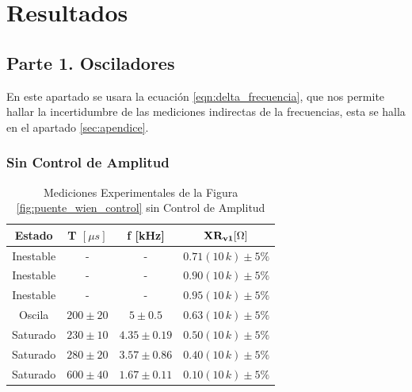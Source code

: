 
\section{Resultados}\label{sec:resultados}

    \subsection{Parte 1. Osciladores}\label{subsec:parte1}

        En este apartado se usara la ecuación \ref{eqn:delta_frecuencia}, que nos permite hallar la incertidumbre de las mediciones indirectas de la frecuencias, esta se halla en el apartado \ref{sec:apendice}.
        
        \subsubsection{Sin Control de Amplitud}
            \begin{table}[H]
              \centering
              \begin{tabular}{|c|c|c|c|}
                \hline
                \textbf{Estado} & \textbf{T $[\mu s]$} & \textbf{f [kHz]} & \textbf{$\mathbf{XR_{v1} [\ohm]}$} \\
                \hline
                Inestable & - & - & $0.71(10 \, k) \pm 5 \%$ \\
                \hline
                Inestable & - & - & $0.90(10 \, k) \pm 5 \%$ \\
                \hline
                Inestable & - & - & $0.95(10 \, k) \pm 5 \%$ \\
                \hline
                Oscila & $200 \pm 20$ & $5 \pm 0.5$ & $0.63(10 \, k) \pm 5 \%$ \\
                \hline
                Saturado & $230 \pm 10$ & $4.35 \pm 0.19$ & $0.50(10 \, k) \pm 5 \%$ \\
                \hline
                Saturado & $280 \pm 20$ & $3.57 \pm 0.86$ & $0.40(10 \, k) \pm 5 \%$ \\
                \hline
                Saturado & $600 \pm 40$ & $1.67 \pm 0.11$ & $0.10(10 \, k) \pm 5 \%$ \\
                \hline
              \end{tabular}
              \caption{Mediciones Experimentales de la Figura \ref{fig:puente_wien_control} sin Control de Amplitud}
              \label{tab:exp_puente_wien_sincontrol}
            \end{table}

